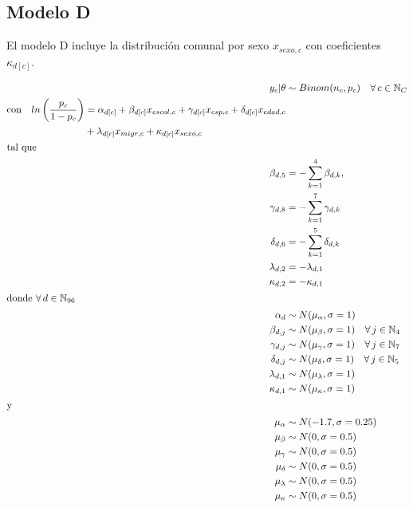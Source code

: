\subsection*{Modelo D}

El modelo D incluye la distribución comunal por sexo $x_{sexo,c}$ con coeficientes $\kappa_{d[c]}$. 

\begin{align}\label{eq:Modelo_Comp_D}
y_c|\theta & \sim Binom(n_c,p_c) \quad \forall \, c \in \mathbb{N}_C \nonumber \\
\begin{split}
\text{con} \quad ln\left(\dfrac{p_c}{1-p_c}\right) &= \alpha_{d[c]} + \beta_{d[c]} x_{escol,c} + \gamma_{d[c]} x_{csp,c} + \delta_{d[c]} x_{edad,c} \\
&+ \lambda_{d[c]} x_{migr,c} + \kappa_{d[c]} x_{sexo,c} 
\end{split}\\
\intertext{tal que} 
\beta_{d,5} &= -\sum\limits_{k = 1}^{4} \beta_{d,k}, \nonumber \\
\gamma_{d,8} &= -\sum\limits_{k = 1}^{7} \gamma_{d,k} \nonumber \\
\delta_{d,6} &= -\sum\limits_{k = 1}^{5} \delta_{d,k} \nonumber \\
\lambda_{d,2} &= -\lambda_{d,1} \nonumber \\
\kappa_{d,2} &= -\kappa_{d,1} \nonumber \\
\intertext{donde $\forall \, d \in \mathbb{N}_{96}$}
\alpha_d & \sim N(\mu_{\alpha}, \sigma=1) \quad  \nonumber \\
\beta_{d,j} & \sim N(\mu_{\beta}, \sigma=1) \quad \forall \, j \in \mathbb{N}_{4} \nonumber \\
\gamma_{d,j} & \sim N(\mu_{\gamma}, \sigma=1) \quad \forall \, j \in \mathbb{N}_{7} \nonumber \\
\delta_{d,j} & \sim N(\mu_{\delta}, \sigma=1) \quad \forall \, j \in \mathbb{N}_{5} \nonumber \\
\lambda_{d,1} & \sim N(\mu_{\lambda}, \sigma=1) \nonumber \\
\kappa_{d,1} & \sim N(\mu_{\kappa}, \sigma=1) \nonumber \\
\intertext{y}
\mu_{\alpha} &\sim N(-1.7,\sigma=0.25) \nonumber \\
\mu_{\beta} &\sim N(0,\sigma=0.5) \nonumber \\
\mu_{\gamma} &\sim N(0,\sigma=0.5) \nonumber \\
\mu_{\delta} &\sim N(0,\sigma=0.5) \nonumber \\
\mu_{\lambda} &\sim N(0,\sigma=0.5) \nonumber \\
\mu_{\kappa} &\sim N(0,\sigma=0.5) \nonumber
\end{align}

